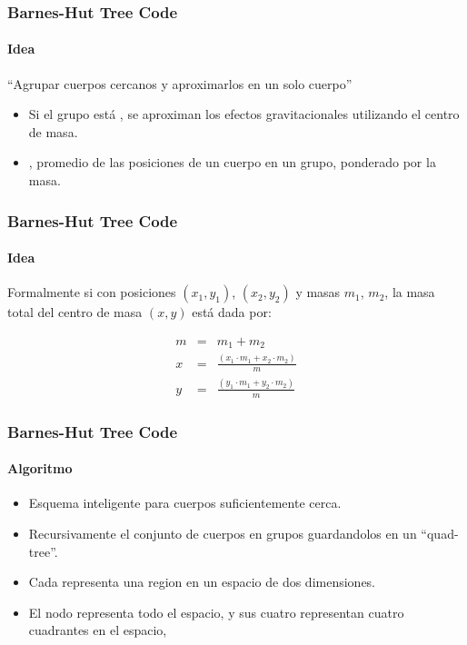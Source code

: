 \frame
{
\frametitle{Barnes-Hut Tree Code}
\framesubtitle{Idea}

\begin{center}
``Agrupar cuerpos cercanos y aproximarlos en un solo cuerpo''
\end{center}

\begin{itemize}
	\item Si el grupo está , se aproximan los efectos gravitacionales
		 utilizando el centro de masa.
	\item {}, promedio de las posiciones de un cuerpo en un grupo,
		 ponderado por la masa.
\end{itemize}
}

\frame
{
\frametitle{Barnes-Hut Tree Code}
\framesubtitle{Idea}


\begin{center}
Formalmente si  con posiciones $(x_{1},y_{1})$, $(x_{2},y_{2})$ y
masas $m_{1}$, $m_{2}$, la masa total del centro de masa $(x,y)$ está dada por:
\end{center}

\begin{eqnarray}
	m &=& m_{1} + m_{2} \nonumber \\
	x &=& \frac{(x_{1}\cdot m_{1} + x_{2}\cdot m_{2})}{m} \nonumber \\
	y &=& \frac{(y_{1}\cdot m_{1} + y_{2}\cdot m_{2})}{m} \nonumber 
\end{eqnarray}

}

\frame
{
\frametitle{Barnes-Hut Tree Code}
\framesubtitle{Algoritmo}

\begin{itemize}
	\item Esquema inteligente para  cuerpos suficientemente cerca.
	\item Recursivamente  el conjunto de cuerpos en grupos
		guardandolos en un ``quad-tree''.
	\item Cada  representa una region en un espacio de dos dimensiones.
	\item El nodo  representa todo el espacio,
		y sus cuatro  representan cuatro cuadrantes en el espacio,
\end{itemize}
}

